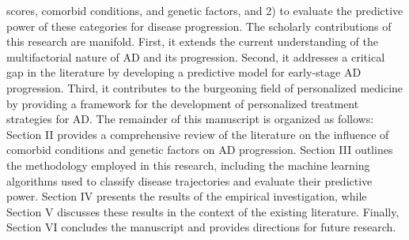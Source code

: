 \documentclass[conference]{IEEEtran}
\begin{document}
scores, comorbid conditions, and genetic factors, and 2) to evaluate the predictive power of these categories for disease progression. The scholarly contributions of this research are manifold. First, it extends the current understanding of the multifactorial nature of AD and its progression. Second, it addresses a critical gap in the literature by developing a predictive model for early-stage AD progression. Third, it contributes to the burgeoning field of personalized medicine by providing a framework for the development of personalized treatment strategies for AD. The remainder of this manuscript is organized as follows: Section II provides a comprehensive review of the literature on the influence of comorbid conditions and genetic factors on AD progression. Section III outlines the methodology employed in this research, including the machine learning algorithms used to classify disease trajectories and evaluate their predictive power. Section IV presents the results of the empirical investigation, while Section V discusses these results in the context of the existing literature. Finally, Section VI concludes the manuscript and provides directions for future research.
\end{document}
